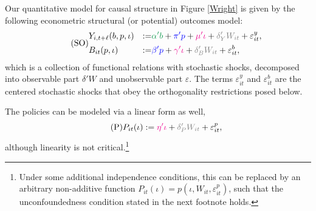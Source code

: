 \documentclass[11pt,reqno,letter]{amsart}
\theoremstyle{definition}
\def\bcolor{\color{ForestGreen}}
\def\pcolor{\color{blue}}
\def\icolor{\color{magenta}}
\def\wcolor{\color{gray}}
\begin{document}
Our quantitative model for causal structure in Figure \ref{Wright} is given by the following econometric structural
 (or potential) outcomes model:\begin{equation} \label{eqn:SEM1} \tag{SO}
  \begin{aligned}
   &  Y_{i,t+\ell} (b,p,\iota) &:=& {\bcolor \alpha ' b}  +  {\pcolor \pi 'p} +
    {\icolor \mu'\iota } + {\wcolor \delta_Y 'W_{it}} + \varepsilon^y_{it}, \\
   &  B_{it} (p,\iota) &:= & {\pcolor \beta'p } + {\icolor \gamma'\iota} +      {\wcolor\delta_B 'W_{it} } + \varepsilon^b_{it},
      \end{aligned}
 \end{equation}
which is a collection of functional relations with stochastic shocks, decomposed into observable part $\delta' W$ and unobservable part $\varepsilon$.
The terms $\varepsilon^y_{it}$ and  $\varepsilon^b_{it} $  are the centered stochastic shocks that obey the orthogonality restrictions posed below.


The policies can be modeled via a linear form as well,
\begin{equation}\label{eq:Policy} \tag{P}
 P_{it}   (\iota) :=  {\icolor\eta'\iota} + {\wcolor \delta_P' W_{it}} +   \varepsilon^p_{it},   \end{equation}
although  linearity is not critical.\footnote{Under some additional independence conditions, this
can be replaced by an arbitrary non-additive function $P_{it}(\iota) = p (\iota, W_{it},  \varepsilon^p_{it})$, such that the unconfoundedness condition stated in the next footnote holds.}
\end{document}
